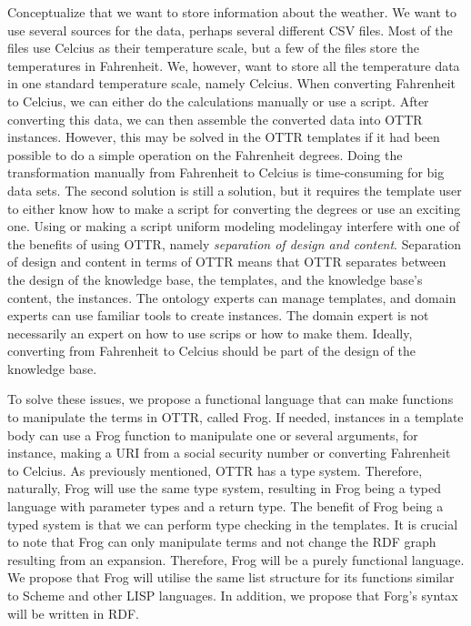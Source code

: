 \para
Conceptualize that we want to store information about the weather. We want to use several sources for the data, perhaps several different CSV files. Most of the files use Celcius as their temperature scale, but a few of the files store the temperatures in Fahrenheit. We, however, want to store all the temperature data in one standard temperature scale, namely Celcius. When converting Fahrenheit to Celcius, we can either do the calculations manually or use a script. After converting this data, we can then assemble the converted data into OTTR instances. However, this may be solved in the OTTR templates if it had been possible to do a simple operation on the Fahrenheit degrees. Doing the transformation manually from Fahrenheit to Celcius is time-consuming for big data sets. The second solution is still a solution, but it requires the template user to either know how to make a script for converting the degrees or use an exciting one. Using or making a script uniform modeling modelingay interfere with one of the benefits of using OTTR, namely \emph{separation of design and content}\autocite[9]{SLKK_OTTR_2021}. Separation of design and content in terms of OTTR means that OTTR separates between the design of the knowledge base, the templates, and the knowledge base's content, the instances. The ontology experts can manage templates, and domain experts can use familiar tools to create instances. The domain expert is not necessarily an expert on how to use scrips or how to make them. Ideally, converting from Fahrenheit to Celcius should be part of the design of the knowledge base.  

\para
To solve these issues, we propose a functional language that can make functions to manipulate the terms in OTTR, called Frog. If needed, instances in a template body can use a Frog function to manipulate one or several arguments, for instance,  making a URI from a social security number or converting Fahrenheit to Celcius. As previously mentioned, OTTR has a type system. Therefore, naturally, Frog will use the same type system, resulting in Frog being a typed language with parameter types and a return type.  The benefit of Frog being a typed system is that we can perform type checking in the templates. It is crucial to note that Frog can only manipulate terms and not change the RDF graph resulting from an expansion. Therefore, Frog will be a purely functional language. We propose that Frog will utilise the same list structure for its functions similar to Scheme and other LISP languages. In addition, we propose that Forg's syntax will be written in RDF.

